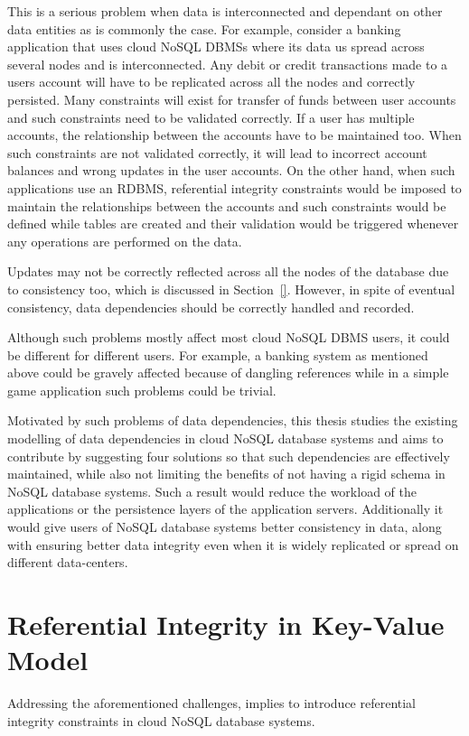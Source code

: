 This is a serious problem when data is interconnected and dependant on other
data entities as is commonly the case.  For example,   consider a banking
application that uses cloud \ac{NoSQL} \acp{DBMS} where its data us spread
across several nodes and is interconnected.  Any debit or credit
transactions made to a users account will have to be replicated across all the
nodes and correctly persisted.  Many constraints will exist for transfer of funds
between user accounts and such constraints need to be validated correctly.  If a
user has multiple accounts,   the relationship between the accounts have to be
maintained too.  When such constraints are not validated correctly,   it will lead
to incorrect account balances and wrong updates in the user accounts.  On the
other hand,   when such applications use an \ac{RDBMS},   referential integrity
constraints would be imposed to maintain the relationships between the
accounts and such constraints would be defined while tables are created and
their validation would be triggered whenever any operations are performed on the
data. 

Updates may not be correctly reflected across all the nodes of the database due
to  consistency too,   which is discussed in Section~\ref{}.  However,   in
spite of eventual consistency,   data dependencies should be correctly handled and
recorded. 

Although such problems mostly affect most cloud \ac{NoSQL} \ac{DBMS} users,   it
could be different for different users.  For example,   a banking system as
mentioned above could be gravely affected because of dangling references while
in a simple game application such problems could be trivial. 

Motivated by such problems of data dependencies,   this thesis studies the
existing modelling of data dependencies in cloud \ac{NoSQL} database systems and
aims to contribute by suggesting four solutions so that such dependencies are
effectively maintained,   while also not limiting the benefits of not having a
rigid schema in \ac{NoSQL} database systems.  Such a result would 
reduce the workload of the applications or the persistence layers of the application
servers.  Additionally it would give users of \ac{NoSQL} database systems
better consistency in data,   along with ensuring better data integrity even when
it is widely replicated or spread on different data-centers. 



\section{Referential Integrity in Key-Value
Model}\label{s:referential-integrity}
Addressing the aforementioned challenges,   implies to introduce referential
integrity constraints in cloud \ac{NoSQL} database systems. 

